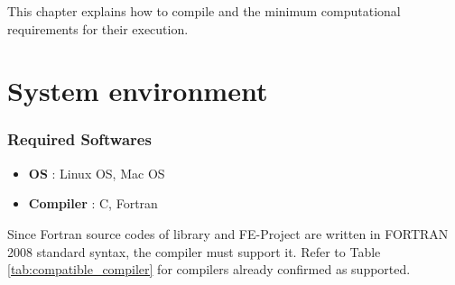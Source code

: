 This chapter explains how to compile \scaledg
and the minimum computational requirements for their execution.

\section{System environment} \label{sec:req_env}




\subsubsection{Required Softwares}

  \begin{itemize}
  \item {\bf OS} : Linux OS, Mac OS
  \item {\bf Compiler} : C, Fortran
  \end{itemize}

Since Fortran source codes of \scalelib library and FE-Project are written in FORTRAN 2008 standard syntax, the compiler must support it.
Refer to Table \ref{tab:compatible_compiler} for compilers already confirmed as supported.


